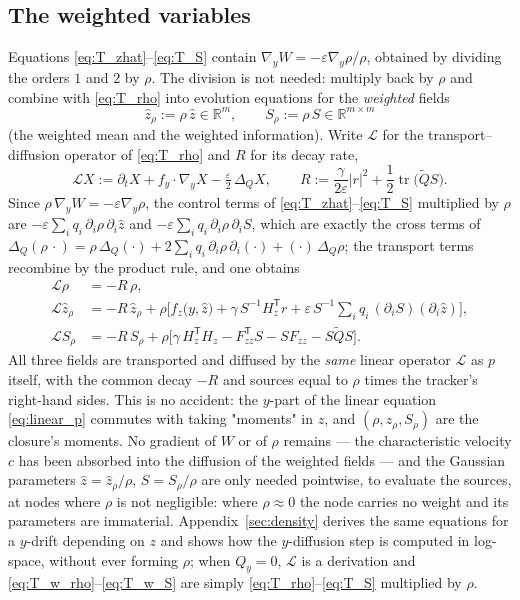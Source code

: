 \documentclass[11pt,a4paper]{article}
\newcommand{\R}{\mathbb{R}}
\newcommand{\tr}{\operatorname{tr}}
\newcommand{\T}{^{\mathsf T}}
\newcommand{\zh}{\hat{z}}
\newcommand{\zr}{\hat{z}_{\rho}}   %
\newcommand{\Sr}{S_{\rho}}          %
\newcommand{\eps}{\varepsilon}
\newcommand{\abs}[1]{\left\lvert #1 \right\rvert}
\newcommand{\gy}{\nabla_{\!y}}
\theoremstyle{plain}
\theoremstyle{definition}
\theoremstyle{remark}
\begin{document}
\subsection{The weighted variables}

Equations \eqref{eq:T_zhat}--\eqref{eq:T_S} contain $\gy W = -\eps\gy\rho/\rho$, obtained by dividing the orders $1$ and $2$ by $\rho$. The division is not needed: multiply back by $\rho$ and combine with \eqref{eq:T_rho} into evolution equations for the \emph{weighted} fields
\begin{equation}
  \zr := \rho\,\zh\in\R^m, \qquad \Sr := \rho\,S\in\R^{m\times m}
  \label{eq:T_weighted}
\end{equation}
(the weighted mean and the weighted information). Write $\mathcal L$ for the transport--diffusion operator of \eqref{eq:T_rho} and $R$ for its decay rate,
\[
  \mathcal LX := \partial_tX + f_y\cdot\gy X - \tfrac\eps2\,\Delta_QX, \qquad
  R := \frac{\gamma}{2\eps}\abs r^2 + \frac12\tr\big(\tilde QS\big).
\]
Since $\rho\,\gy W = -\eps\gy\rho$, the control terms of \eqref{eq:T_zhat}--\eqref{eq:T_S} multiplied by $\rho$ are $-\eps\sum_iq_i\,\partial_i\rho\,\partial_i\zh$ and $-\eps\sum_iq_i\,\partial_i\rho\,\partial_iS$, which are exactly the cross terms of $\Delta_Q(\rho\,\cdot) = \rho\,\Delta_Q(\cdot) + 2\sum_iq_i\,\partial_i\rho\,\partial_i(\cdot) + (\cdot)\,\Delta_Q\rho$; the transport terms recombine by the product rule, and one obtains
\begin{align}
  \mathcal L\rho &= -R\,\rho, \label{eq:T_w_rho}\\
  \mathcal L\zr &= -R\,\zr + \rho\Big[ f_z\big(y,\zh\big) + \gamma\,S^{-1}H_z\T r + \eps\,S^{-1}\!\sum_iq_i\,(\partial_iS)(\partial_i\zh)\Big], \label{eq:T_w_z}\\
  \mathcal L\Sr &= -R\,\Sr + \rho\Big[ \gamma\,H_z\T H_z - F_{zz}\T S - SF_{zz} - S\tilde QS\Big]. \label{eq:T_w_S}
\end{align}
All three fields are transported and diffused by the \emph{same} linear operator $\mathcal L$ as $p$ itself, with the common decay $-R$ and sources equal to $\rho$ times the tracker's right-hand sides. This is no accident: the $y$-part of the linear equation \eqref{eq:linear_p} commutes with taking "moments" in $z$, and $(\rho,\zr,\Sr)$ are the closure's moments. No gradient of $W$ or of $\rho$ remains --- the characteristic velocity $c$ has been absorbed into the diffusion of the weighted fields --- and the Gaussian parameters $\zh = \zr/\rho$, $S = \Sr/\rho$ are only needed pointwise, to evaluate the sources, at nodes where $\rho$ is not negligible: where $\rho\approx0$ the node carries no weight and its parameters are immaterial. Appendix~\ref{sec:density} derives the same equations for a $y$-drift depending on $z$ and shows how the $y$-diffusion step is computed in log-space, without ever forming $\rho$; when $Q_y=0$, $\mathcal L$ is a derivation and \eqref{eq:T_w_rho}--\eqref{eq:T_w_S} are simply \eqref{eq:T_rho}--\eqref{eq:T_S} multiplied by $\rho$.
\end{document}
